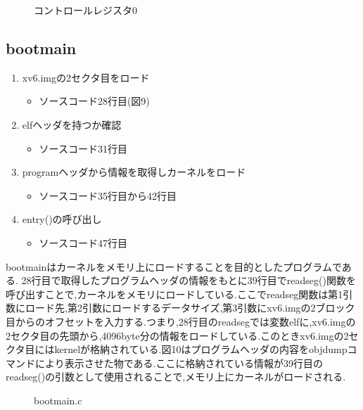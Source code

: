 \documentclass[submit,techreq,noauthor]{eco}	%
\begin{document}
\begin{figure}[H]
    \centering
    \caption{コントロールレジスタ0}
    \label{sample}
\end{figure}

\subsection{bootmain}
\begin{enumerate}
\renewcommand{\labelenumi}{\arabic{enumi}).}
\item xv6.imgの2セクタ目をロード
  \begin{itemize}
    \item ソースコード28行目(図9)
  \end{itemize}
\item elfヘッダを持つか確認
  \begin{itemize}
    \item ソースコード31行目
  \end{itemize}
\item programヘッダから情報を取得しカーネルをロード
  \begin{itemize}
    \item  ソースコード35行目から42行目
  \end{itemize}
\item entry()の呼び出し
   \begin{itemize}
    \item ソースコード47行目
  \end{itemize}
\end{enumerate}

bootmainはカーネルをメモリ上にロードすることを目的としたプログラムである.
28行目で取得したプログラムヘッダの情報をもとに39行目でreadseg()関数を呼び出すことで,カーネルをメモリにロードしている.ここでreadseg関数は第1引数にロード先,第2引数にロードするデータサイズ,第3引数にxv6.imgの2ブロック目からのオフセットを入力する.つまり,28行目のreadsegでは変数elfに,xv6.imgの2セクタ目の先頭から,4096byte分の情報をロードしている.このときxv6.imgの2セクタ目にはkernelが格納されている.図10はプログラムヘッダの内容をobjdumpコマンドにより表示させた物である.ここに格納されている情報が39行目のreadseg()の引数として使用されることで,メモリ上にカーネルがロードされる.
\begin{figure}[H]
    \centering
    \caption{bootmain.c}
    \label{sample}
\end{figure}
\end{document}
